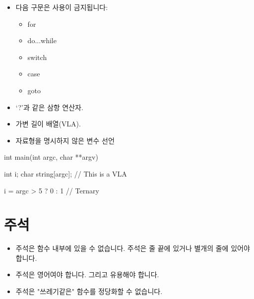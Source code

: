 \documentclass{42-ko}
\begin{document}
        \begin{itemize}

            \item 다음 구문은 사용이 금지됩니다:

                \begin{itemize}

                    \item for
                    \item do...while
                    \item switch
                    \item case
                    \item goto

                \end{itemize}

            \item `?'과 같은 삼항 연산자.

            \item 가변 길이 배열(VLA).

            \item 자료형을 명시하지 않은 변수 선언

        \end{itemize}
        \begin{42ccode}
    int main(int argc, char **argv)
    {
        int     i;
        char    string[argc]; // This is a VLA

        i = argc > 5 ? 0 : 1 // Ternary
    }
        \end{42ccode}
        \newpage

    \section{주석}

        \begin{itemize}

            \item 주석은 함수 내부에 있을 수 없습니다. 
				주석은 줄 끝에 있거나 별개의 줄에 있어야 합니다.

            \item 주석은 영어여야 합니다. 그리고 유용해야 합니다.

            \item 주석은 "쓰레기같은" 함수를 정당화할 수 없습니다.

        \end{itemize}
        \newpage
\end{document}
